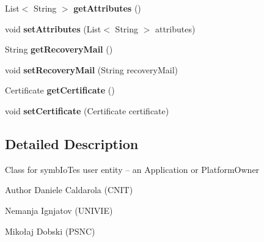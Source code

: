 \begin{DoxyCompactItemize}
\item 
List$<$ String $>$ {\bfseries get\+Attributes} ()\hypertarget{classeu_1_1h2020_1_1symbiote_1_1security_1_1commons_1_1User_a9b27b53e587125584372aa44e037fa84}{}\label{classeu_1_1h2020_1_1symbiote_1_1security_1_1commons_1_1User_a9b27b53e587125584372aa44e037fa84}

\item 
void {\bfseries set\+Attributes} (List$<$ String $>$ attributes)\hypertarget{classeu_1_1h2020_1_1symbiote_1_1security_1_1commons_1_1User_a438797ccbef532569a2939c8505dcc35}{}\label{classeu_1_1h2020_1_1symbiote_1_1security_1_1commons_1_1User_a438797ccbef532569a2939c8505dcc35}

\item 
String {\bfseries get\+Recovery\+Mail} ()\hypertarget{classeu_1_1h2020_1_1symbiote_1_1security_1_1commons_1_1User_afd08dcdbfe69b5f899f3b1798b29456f}{}\label{classeu_1_1h2020_1_1symbiote_1_1security_1_1commons_1_1User_afd08dcdbfe69b5f899f3b1798b29456f}

\item 
void {\bfseries set\+Recovery\+Mail} (String recovery\+Mail)\hypertarget{classeu_1_1h2020_1_1symbiote_1_1security_1_1commons_1_1User_a2a33e847fdb6fcc11dd24a6617e649a3}{}\label{classeu_1_1h2020_1_1symbiote_1_1security_1_1commons_1_1User_a2a33e847fdb6fcc11dd24a6617e649a3}

\item 
Certificate {\bfseries get\+Certificate} ()\hypertarget{classeu_1_1h2020_1_1symbiote_1_1security_1_1commons_1_1User_ab4f8e1351a6895d2dfa70a4e9e6b446b}{}\label{classeu_1_1h2020_1_1symbiote_1_1security_1_1commons_1_1User_ab4f8e1351a6895d2dfa70a4e9e6b446b}

\item 
void {\bfseries set\+Certificate} (Certificate certificate)\hypertarget{classeu_1_1h2020_1_1symbiote_1_1security_1_1commons_1_1User_a03534851356555a495f62528995832e4}{}\label{classeu_1_1h2020_1_1symbiote_1_1security_1_1commons_1_1User_a03534851356555a495f62528995832e4}

\end{DoxyCompactItemize}



\subsection{Detailed Description}
Class for symb\+Io\+Te\textquotesingle{}s user entity -- an Application or Platform\+Owner

\begin{DoxyAuthor}{Author}
Daniele Caldarola (C\+N\+IT) 

Nemanja Ignjatov (U\+N\+I\+V\+IE) 

Mikołaj Dobski (P\+S\+NC) 
\end{DoxyAuthor}


